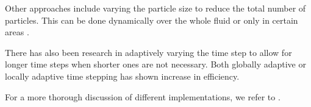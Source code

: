 \documentclass[../../main.tex]{subfiles}
\begin{document}
Other approaches include varying the particle size to reduce the total number of particles. This can be done dynamically over the whole fluid \citep{adams2007adaptively,hong2008adaptive} or only in certain areas \citep{solenthaler2011two,horvath2013mass}. 

There has also been research in adaptively varying the time step to allow for longer time steps when shorter ones are not necessary. Both globally adaptive \citep{ihmsen2010boundary,goswami2011time} or locally adaptive \citep{goswami2014regional} time stepping has shown increase in efficiency. 


For a more thorough discussion of different implementations, we refer to \citet{ihmsen2014sph}.
\end{document}
